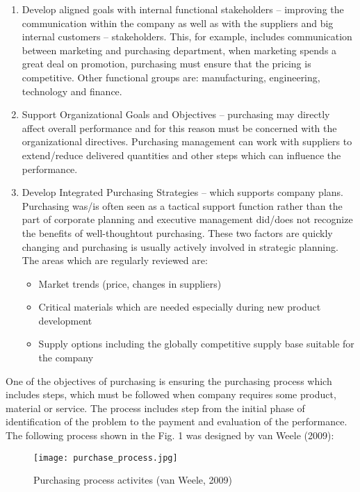 \documentclass[oneside,12pt]{article}%
\begin{document}
\begin{enumerate}
  \item Develop aligned goals with internal functional stakeholders – improving the communication within the company as well as with the suppliers and big internal customers – stakeholders. This, for example, includes communication between marketing and purchasing department, when marketing spends a great deal on promotion, purchasing must ensure that the pricing is competitive. Other functional groups are: manufacturing, engineering, technology and finance.

  \item Support Organizational Goals and Objectives – purchasing may directly affect overall performance and for this reason must be concerned with the organizational directives. Purchasing management can work with suppliers to extend/reduce delivered quantities and other steps which can influence the performance.

  \item Develop Integrated Purchasing Strategies – which supports company plans. Purchasing was/is often seen as a tactical support function rather than the part of corporate planning and executive management did/does not recognize the benefits of well-thoughtout purchasing. These two factors are quickly changing and purchasing is usually actively involved in strategic planning. The areas which are regularly reviewed are:
  \begin{itemize}
    \item Market trends (price, changes in suppliers)
    \item Critical materials which are needed especially during new product development
    \item Supply options including the globally competitive supply base suitable for the company
  \end{itemize}

\end{enumerate}
  One of the objectives of purchasing is ensuring the purchasing process which includes steps, which must be followed when company requires some product, material or service. The process includes step from the initial phase of identification of the problem to the payment and evaluation of the performance. The following process shown in the Fig. 1 was designed by van Weele (2009):


\begin{figure}[ht!]
  \texttt{[image: purchase\_process.jpg]}
  \caption{Purchasing process activites (van Weele, 2009)}
\end{figure}
\end{document}
